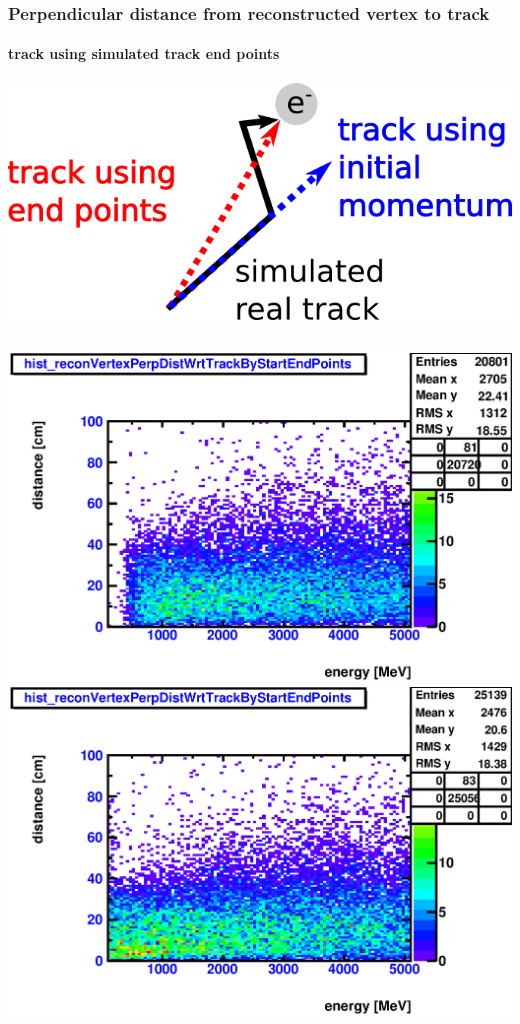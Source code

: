 \documentclass{beamer}
\begin{document}
\begin{frame}
	\frametitle{Perpendicular distance from reconstructed vertex to track}
	\framesubtitle{track using simulated track end points}
	\begin{center}
		\includegraphics[height=0.2\textheight]{track_definition.png}
	\end{center}
	\begin{columns}[t]
		\includegraphics[width=1.0\textwidth]{nue_H1_reconVertexPerpDistWrtTrackByStartEndPoints_onlyCC_maxR600cm.eps}\\
		\includegraphics[width=1.0\textwidth]{nue_C12_reconVertexPerpDistWrtTrackByStartEndPoints_onlyCC_maxR600cm.eps}
	\end{columns}
\end{frame}
\end{document}
